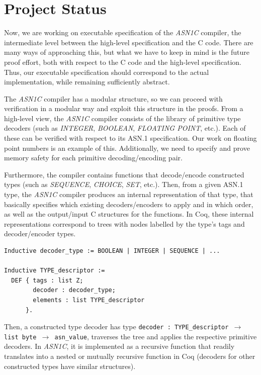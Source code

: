 \documentclass[acmsmall,nonacm]{acmart}
\begin{document}
\section{Project Status}

Now, we are working on executable specification of the \emph{ASN1C}
compiler, the intermediate level between the high-level specification
and the C code. There are many ways of approaching this, but what we
have to keep in mind is the future proof effort, both with respect to
the C code and the high-level specification. Thus, our executable
specification should correspond to the actual implementation, while remaining
sufficiently abstract.

The \emph{ASN1C} compiler has a modular structure, so we can proceed with
verification in a modular way and exploit this structure in the
proofs. From a high-level view, the \emph{ASN1C} compiler consists of
the library of primitive type decoders (such as \emph{INTEGER}, \emph{BOOLEAN},
\emph{FLOATING POINT}, etc.). Each of these can be verified with respect to its
ASN.1 specification. Our work on floating point numbers is an example
of this. Additionally, we need to specify and prove memory safety
for each primitive decoding/encoding pair.

Furthermore, the compiler contains functions that decode/encode
constructed types (such as \emph{SEQUENCE}, \emph{CHOICE}, \emph{SET}, etc.). Then, from a
given ASN.1 type, the \emph{ASN1C} compiler produces an internal
representation of that type, that basically specifies which existing
decoders/encoders to apply and in which order, as well as the
output/input C structures for the functions. In Coq,
these internal representations correspond to trees with nodes labelled by the
type's tags and decoder/encoder types.

 \begin{lstlisting}[language=Coq]
Inductive decoder_type := BOOLEAN | INTEGER | SEQUENCE | ...

Inductive TYPE_descriptor :=
  DEF { tags : list Z;
        decoder : decoder_type;
        elements : list TYPE_descriptor 
      }.
 \end{lstlisting}

 Then, a constructed type decoder has type \texttt{decoder : TYPE\_descriptor $\rightarrow$ list byte $\rightarrow$ asn\_value}, traverses the tree and applies the respective primitive decoders. In \emph{ASN1C}, it is implemented as
 a recursive function that readily translates into a nested or mutually recursive
 function in Coq (decoders for other constructed types have similar
 structures).
\end{document}
